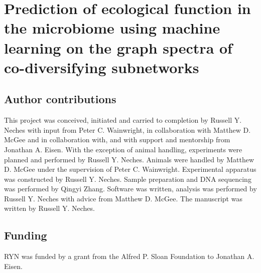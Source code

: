 

\chapter{Prediction of ecological function in the microbiome using machine learning on the graph spectra of co-diversifying subnetworks}


\section{Author contributions}

This project was conceived, initiated and carried to completion by Russell Y. Neches with input from Peter C. Wainwright, in collaboration with Matthew D. McGee and in collaboration with, and with support and mentorship from Jonathan A. Eisen. With the exception of animal handling, experiments were planned and performed by Russell Y. Neches. Animals were handled by Matthew D. McGee under the supervision of Peter C. Wainwright. Experimental apparatus was constructed by Russell Y. Neches. Sample preparation and DNA sequencing was performed by Qingyi Zhang. Software was written, analysis was performed by Russell Y. Neches with advice from Matthew D. McGee. The manuscript was written by Russell Y. Neches.









\section{Funding}

RYN was funded by a grant from the Alfred P. Sloan Foundation to Jonathan A. Eisen. 

\printbibliography[segment=2]



